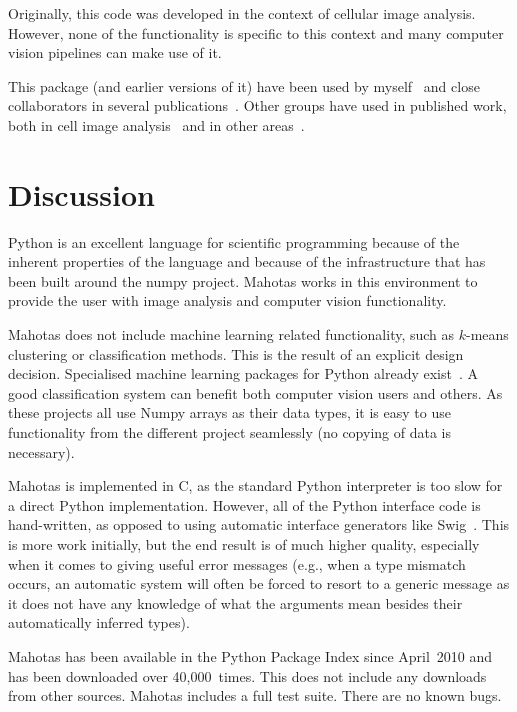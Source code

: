 \documentclass{scrartcl}
\newcommand*{\cpp}{{C\nolinebreak[4]\hspace{-.05em}\raisebox{.4ex}{\tiny\textbf{++}}}}
\begin{document}
Originally, this code was developed in the context of cellular image analysis.
However, none of the functionality is specific to this context and many
computer vision pipelines can make use of it.

This package (and earlier versions of it) have been used by
myself~\citep{Coelho2009,Coelho2010a} and close collaborators in several
publications~\citep{omerosearcher}. Other groups have used in published work,
both in cell image analysis~\citep{CYTO:CYTO22034} and in other
areas~\citep{springerlink:10.1007/978-3-642-32335-5_2}.

\section{Discussion}

Python is an excellent language for scientific programming because of the
inherent properties of the language and because of the infrastructure that has
been built around the numpy project. Mahotas works in this environment to
provide the user with image analysis and computer vision functionality.

Mahotas does not include machine learning related functionality, such as
$k$-means clustering or classification methods. This is the result of an
explicit design decision. Specialised machine learning packages for Python
already
exist~\citep{Pedregosa:2011:SML:2078183.2078195,springerlink:10.1007/978-3-540-30116-5_58,Schaul:2010:PYB:1756006.1756030,Sonnenburg:2010:SML:1756006.1859911}.
A good classification system can benefit both computer vision users
and others. As these projects all use Numpy arrays as their data types, it is
easy to use functionality from the different project seamlessly (no copying of
data is necessary).

Mahotas is implemented in \cpp{}, as the standard Python interpreter is too
slow for a direct Python implementation. However, all of the Python interface
code is hand-written, as opposed to using automatic interface generators like
Swig~\citep{Beazley2003599}. This is more work initially, but the end result is
of much higher quality, especially when it comes to giving useful error
messages (e.g., when a type mismatch occurs, an automatic system will often be
forced to resort to a generic message as it does not have any knowledge of what
the arguments mean besides their automatically inferred types).

Mahotas has been available in the Python Package Index since April~2010 and has
been downloaded over 40,000~times. This does not include any downloads from
other sources. Mahotas includes a full test suite. There are no known bugs.
\end{document}
